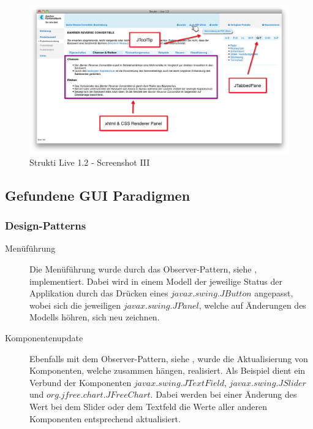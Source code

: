   \begin{figure}[htb]
    \begin{center}
      \includegraphics[width=\textwidth]{./image/SL/SL-03.png}
      \caption{Strukti Live 1.2 - Screenshot III}
      \label{img:SL-03}
    \end{center}
  \end{figure}
  
  \subsection{Gefundene GUI Paradigmen}

  \subsubsection{Design-Patterns}
  
  \begin{description}
    \item[Menüführung]
    Die Menüführung wurde durch das Observer-Pattern, siehe
    \cite{ObserverDesignPattern}, implementiert. Dabei wird in einem Modell
    der jeweilige Status der Applikation durch das Drücken eines
    \(javax.swing.JButton\) angepasst, wobei sich die jeweiligen
    \(javax.swing.JPanel\), welche auf Änderungen des Modells höhren, sich neu
    zeichnen.
    \item[Komponentenupdate]
    Ebenfalls mit dem Observer-Pattern, siehe \cite{ObserverDesignPattern},
    wurde die Aktualisierung von Komponenten, welche zusammen hängen,
    realisiert. Als Beispiel dient ein Verbund der Komponenten
    \(javax.swing.JTextField\), \(javax.swing.JSlider\) und
    \(org.jfree.chart.JFreeChart\). Dabei werden bei einer Änderung des Wert bei
    dem Slider oder dem Textfeld die Werte aller anderen Komponenten
    entsprechend aktualisiert.
  \end{description}
  
